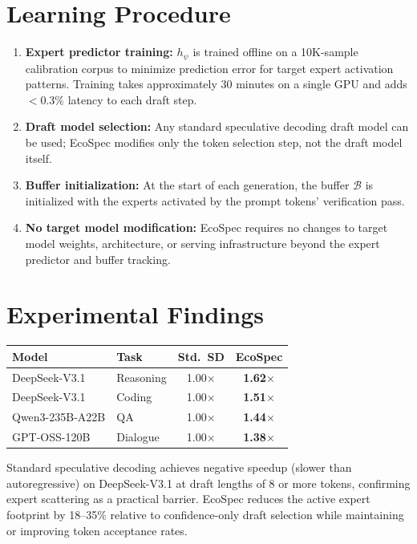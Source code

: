 \documentclass[10pt,twocolumn]{article}
\begin{document}
\section{Learning Procedure}

\begin{enumerate}[itemsep=2pt,parsep=0pt]
  \item \textbf{Expert predictor training:} $h_\psi$ is trained
    offline on a 10K-sample calibration corpus to minimize
    prediction error for target expert activation patterns.
    Training takes approximately 30 minutes on a single GPU and
    adds $<$0.3\% latency to each draft step.
  \item \textbf{Draft model selection:} Any standard speculative
    decoding draft model can be used; EcoSpec modifies only the
    token selection step, not the draft model itself.
  \item \textbf{Buffer initialization:} At the start of each
    generation, the buffer $\mathcal{B}$ is initialized with
    the experts activated by the prompt tokens' verification pass.
  \item \textbf{No target model modification:} EcoSpec requires
    no changes to target model weights, architecture, or serving
    infrastructure beyond the expert predictor and buffer tracking.
\end{enumerate}

\section{Experimental Findings}

\begin{center}
\small
\begin{tabular}{llcc}
\toprule
Model & Task & Std.\ SD & EcoSpec \\
\midrule
DeepSeek-V3.1 & Reasoning & 1.00$\times$ & \textbf{1.62}$\times$ \\
DeepSeek-V3.1 & Coding & 1.00$\times$ & \textbf{1.51}$\times$ \\
Qwen3-235B-A22B & QA & 1.00$\times$ & \textbf{1.44}$\times$ \\
GPT-OSS-120B & Dialogue & 1.00$\times$ & \textbf{1.38}$\times$ \\
\bottomrule
\end{tabular}
\end{center}

Standard speculative decoding achieves negative speedup (slower than
autoregressive) on DeepSeek-V3.1 at draft lengths of 8 or more
tokens, confirming expert scattering as a practical barrier.
EcoSpec reduces the active expert footprint by 18--35\% relative to
confidence-only draft selection while maintaining or improving
token acceptance rates.
\end{document}
